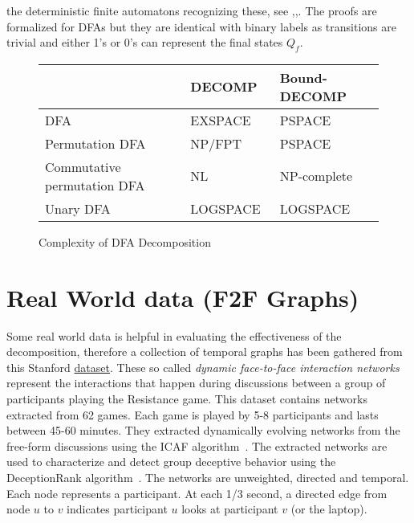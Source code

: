 the deterministic finite automatons recognizing these, see \cite{prime-languages},\cite{unara-prime-languages},\cite{DBLP:journals/corr/abs-2107-04683}. The proofs are formalized for DFAs but they are identical with binary labels as transitions are trivial and either 1's or 0's can represent the final states $Q_f$. 

\begin{figure}[h]
	\begin{tabular}{l|lll}
		&  & DECOMP & Bound-DECOMP  \\
		\hline
		DFA&  & EXSPACE~\cite{prime-languages} & PSPACE~\cite{DBLP:journals/corr/abs-2107-04683}  \\
		Permutation DFA&  & NP/FPT\cite{DBLP:journals/corr/abs-2107-04683}  & PSPACE~\cite{DBLP:journals/corr/abs-2107-04683} \\
		Commutative permutation DFA&  & NL~\cite{DBLP:journals/corr/abs-2107-04683} & NP-complete~\cite{DBLP:journals/corr/abs-2107-04683} \\
		Unary DFA&  & LOGSPACE~\cite{unara-prime-languages} &  LOGSPACE~\cite{DBLP:journals/corr/abs-2107-04683}
	\end{tabular}
	\caption{Complexity of DFA Decomposition}
	\label{tab:dfa-decomp-complexity}
\end{figure}

\section{Real World data (F2F Graphs)}
Some real world data is helpful in evaluating the effectiveness of the decomposition, therefore a collection of temporal graphs has been gathered from this Stanford \href{https://snap.stanford.edu/data/comm-f2f-Resistance.html}{dataset}. These so called \textit{dynamic face-to-face interaction networks} represent the interactions that happen during discussions between a group of participants playing the Resistance game. This dataset contains networks extracted from 62 games. Each game is played by 5-8 participants and lasts between 45-60 minutes. They extracted dynamically evolving networks from the free-form discussions using the ICAF algorithm~\cite{f2f-bai2019predicting}. The extracted networks are used to characterize and detect group deceptive behavior using the DeceptionRank algorithm~\cite{f2f-kumar2021deception}. The networks are unweighted, directed and temporal. Each node represents a participant. At each 1/3 second, a directed edge from node $u$ to $v$ indicates participant $u$ looks at participant $v$ (or the laptop).

